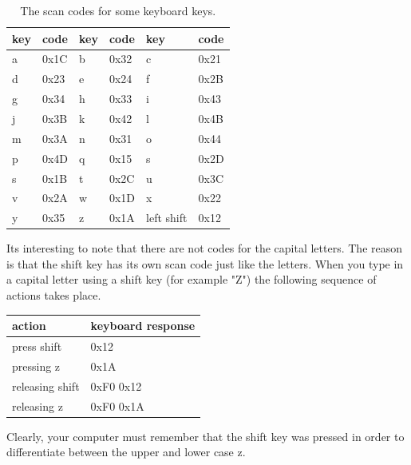 \begin{table}
\begin{tabular}{l|l|l|l|l|l}
key & code	& key & code	& key & code \\ \hline \hline
a   & 0x1C	& b   & 0x32	& c   & 0x21	\\ \hline
d   & 0x23	& e   & 0x24	& f   & 0x2B	\\ \hline
g   & 0x34	& h   & 0x33	& i   & 0x43	\\ \hline
j   & 0x3B	& k   & 0x42	& l   & 0x4B	\\ \hline
m   & 0x3A	& n   & 0x31	& o   & 0x44	\\ \hline
p   & 0x4D	& q   & 0x15	& s   & 0x2D	\\ \hline
s   & 0x1B	& t   & 0x2C	& u   & 0x3C	\\ \hline
v   & 0x2A	& w   & 0x1D	& x   & 0x22	\\ \hline
y   & 0x35	& z   & 0x1A	& left shift & 0x12	\\ 
\end{tabular}
\caption{The scan codes for some keyboard keys.}
\label{table:keyboard}
\end{table}

Its interesting to note that there are not codes for the capital
letters.  The reason is that the shift key has its own scan
code just like the letters.  When you type in a capital letter
using a shift key (for example "Z") the following sequence of 
actions takes place.

\begin{tabular} {l|l}
action		&	keyboard response	\\ \hline \hline
press shift	&	0x12			\\ \hline
pressing z	&	0x1A			\\ \hline
releasing shift	&	0xF0 0x12		\\ \hline
releasing z	&	0xF0 0x1A		\\ 
\end{tabular}

Clearly, your computer must remember that the shift key was pressed 
in order to differentiate between the upper and lower case z.

